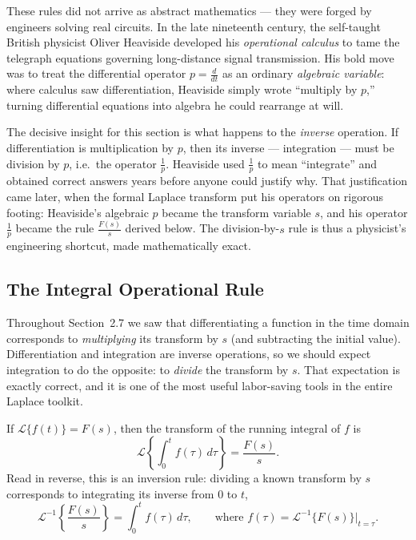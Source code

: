\documentclass[11pt]{article}
\begin{document}
\begin{conceptbox}
These rules did not arrive as abstract mathematics --- they were forged by engineers solving real circuits. In the late nineteenth century, the self-taught British physicist \textcolor{accentorange}{Oliver Heaviside} developed his \emph{operational calculus} to tame the telegraph equations governing long-distance signal transmission. His bold move was to treat the differential operator $p = \frac{d}{dt}$ as an ordinary \emph{algebraic variable}: where calculus saw differentiation, Heaviside simply wrote ``multiply by $p$,'' turning differential equations into algebra he could rearrange at will.

\smallskip
The decisive insight for this section is what happens to the \emph{inverse} operation. If differentiation is multiplication by $p$, then its inverse --- \textcolor{accentorange}{integration} --- must be \textcolor{accentorange}{division by $p$}, i.e.\ the operator $\tfrac{1}{p}$. Heaviside used $\tfrac{1}{p}$ to mean ``integrate'' and obtained correct answers years before anyone could justify why. That justification came later, when the formal \textcolor{accentorange}{Laplace transform} put his operators on rigorous footing: Heaviside's algebraic $p$ became the transform variable $s$, and his operator $\tfrac{1}{p}$ became the rule $\frac{F(s)}{s}$ derived below. The division-by-$s$ rule is thus a physicist's engineering shortcut, made mathematically exact.
\end{conceptbox}

\subsection{The Integral Operational Rule}

Throughout Section~2.7 we saw that differentiating a function in the time domain corresponds to \emph{multiplying} its transform by $s$ (and subtracting the initial value). Differentiation and integration are inverse operations, so we should expect integration to do the opposite: to \emph{divide} the transform by $s$. That expectation is exactly correct, and it is one of the most useful labor-saving tools in the entire Laplace toolkit.

\begin{formulabox}
If $\mathcal{L}\{f(t)\} = F(s)$, then the transform of the running integral of $f$ is
\[ \mathcal{L}\!\left\{\int_0^t f(\tau)\,d\tau\right\} = \frac{F(s)}{s}. \]
Read in reverse, this is an inversion rule: dividing a known transform by $s$ corresponds to integrating its inverse from $0$ to $t$,
\[ \mathcal{L}^{-1}\!\left\{\frac{F(s)}{s}\right\} = \int_0^t f(\tau)\,d\tau, \qquad\text{where } f(\tau) = \mathcal{L}^{-1}\{F(s)\}\big|_{t=\tau}. \]
\end{formulabox}
\end{document}
